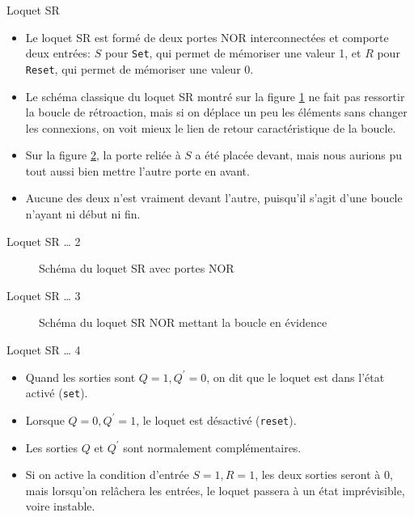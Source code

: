 \documentclass[presentation]{beamer}
\begin{document}
\begin{frame}[label={sec:org01d12e2},fragile]{Loquet SR}
 \begin{itemize}
\item Le loquet SR est formé de deux portes NOR interconnectées et comporte deux entrées: \(S\) pour \texttt{Set}, qui permet de mémoriser une valeur 1, et \(R\) pour \texttt{Reset}, qui permet de mémoriser une valeur 0.

\item Le schéma classique du loquet SR montré sur la figure \ref{fig:org917612e} ne fait pas ressortir la boucle de rétroaction, mais si on déplace un peu les éléments sans changer les connexions, on voit mieux le lien de retour caractéristique de la boucle.

\item Sur la figure \ref{fig:orge298dd8}, la porte reliée à \(S\) a été placée devant, mais nous aurions pu tout aussi bien mettre l'autre porte en avant.

\item Aucune des deux n'est vraiment devant l'autre, puisqu'il s'agit d'une boucle n'ayant ni début ni fin.
\end{itemize}
\end{frame}

\begin{frame}[label={sec:org291a86e}]{Loquet SR \ldots{} 2}
\begin{figure}[htbp]
\centering

\caption{\label{fig:org917612e}Schéma du loquet SR avec portes NOR}
\end{figure}
\end{frame}

\begin{frame}[label={sec:org56a31d6}]{Loquet SR \ldots{} 3}
\begin{figure}[htbp]
\centering

\caption{\label{fig:orge298dd8}Schéma du loquet SR NOR mettant la boucle en évidence}
\end{figure}
\end{frame}

\begin{frame}[label={sec:orgd50fbb0},fragile]{Loquet SR \ldots{} 4}
 \begin{itemize}
\item Quand les sorties sont \(Q=1, Q^\prime=0\), on dit que le loquet est dans l'état activé (\texttt{set}).

\item Lorsque \(Q=0, Q^\prime=1\), le loquet est désactivé (\texttt{reset}).

\item Les sorties \(Q\) et \(Q^\prime\) sont normalement complémentaires.

\item Si on active la condition d'entrée \(S=1, R=1\), les deux sorties seront à 0, mais lorsqu'on relâchera les entrées, le loquet passera à un état imprévisible, voire instable.
\end{itemize}
\end{frame}
\end{document}
